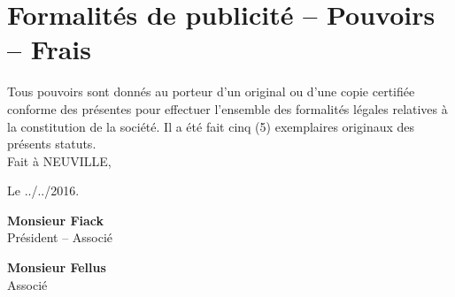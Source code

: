 \documentclass[a4paper,12pt]{report}
\begin{document}
\section{Formalités de publicité -- Pouvoirs -- Frais}
Tous pouvoirs sont donnés au porteur d'un original ou d'une copie certifiée conforme des présentes pour effectuer l'ensemble des formalités légales relatives à la constitution de la société.
Il a été fait cinq (5) exemplaires originaux des présents statuts.\\

Fait à NEUVILLE,

Le ../../2016.\\

\vspace{2cm}

\begin{minipage}{0.45\linewidth}
	\center
	\textbf{Monsieur Fiack}\\
	Président -- Associé
\end{minipage}
\begin{minipage}{0.45\linewidth}
	\center
	\textbf{Monsieur Fellus}\\
	Associé
\end{minipage}
\end{document}
